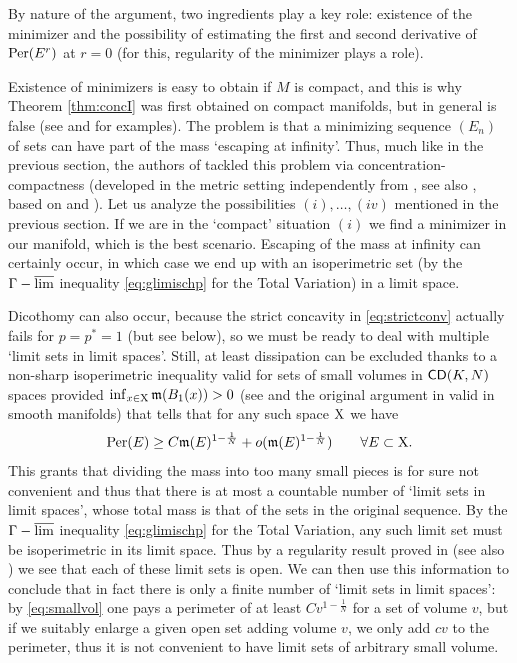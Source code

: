 \documentclass[11pt]{article}
\numberwithin{equation}{section}
\newcommand{\X}{{\rm X}}
\newcommand{\mm}{{\mathfrak m}}
\newcommand{\CD}{{\sf CD}}
\newcommand{\lims}{\varlimsup}
\DeclareMathOperator*{\glims}{\Gamma-\lims}
\begin{document}
By nature of the argument,  two ingredients play a key role: existence of the minimizer and the possibility of estimating the first and second derivative of ${\rm Per}(E^r)$ at $r=0$ (for this, regularity of the minimizer plays a role).

Existence of minimizers is easy to obtain if $M$ is compact, and this is why Theorem \ref{thm:concI} was first obtained on compact manifolds, but in general is false (see \cite{Rit01} and \cite{AFP21} for examples). The problem is that a minimizing sequence $(E_n)$ of sets can have part of the mass `escaping at infinity'. Thus, much like in the previous section, the authors of \cite{APPS22b}  tackled this problem via concentration-compactness (developed in the metric setting independently from \cite{NobiliViolo22}, see also \cite{AntonelliNardulliPozzetta22}, based on \cite{AFP21} and \cite{Nard14}). Let us analyze the possibilities $(i),\ldots,(iv)$ mentioned in the previous section. If we are in the `compact' situation $(i)$ we find a minimizer in our manifold, which is the best scenario. Escaping of the mass at infinity can certainly occur, in which case we end up with an isoperimetric set (by the $\glims$ inequality  \eqref{eq:glimischp} for the Total Variation) in a limit space. 

Dicothomy can also occur, because the strict concavity in \eqref{eq:strictconv} actually fails for $p=p^*=1$ (but see below), so we must be ready to deal with multiple `limit sets in limit spaces'.  Still, at least   dissipation can be excluded thanks to a non-sharp isoperimetric inequality valid for sets of small volumes in $\CD(K,N)$ spaces provided $\inf_{x\in\X}\mm(B_1(x))>0$ (see \cite{APP22} and the original argument in \cite{CouSal93} valid in smooth manifolds) that tells that for any such space $\X$ we have 
\begin{equation}
\label{eq:smallvol}
{\rm Per}(E)\geq C \mm(E)^{1-\frac1N}+o(\mm(E)^{1-\frac1N})\qquad\forall E\subset\X.
\end{equation}
This grants  that dividing the mass into too many small pieces is for sure not convenient and thus that there is at most a countable number of `limit sets in limit spaces', whose total mass is that of the sets in the original sequence. By the $\glims$ inequality  \eqref{eq:glimischp} for the Total Variation, any such limit set must be isoperimetric in its limit space. Thus by a regularity result proved in \cite{APP22} (see also \cite{APPV23}) we see that each of these limit sets is open. We can then  use this information  to conclude that in fact there is only a finite number of  `limit sets in limit spaces':  by \eqref{eq:smallvol} one pays a perimeter of at least $Cv^{1-\frac1N}$ for a set of volume $v$, but if we suitably enlarge a given open set adding volume $v$, we only add $cv$ to the perimeter, thus it is not convenient to have limit sets of arbitrary small volume.
\end{document}
